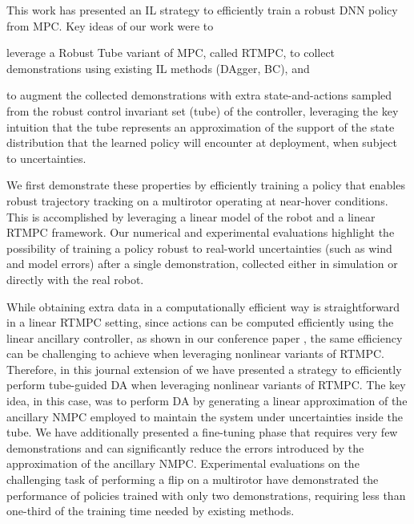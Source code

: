 
This work has presented an \ac{IL} strategy to efficiently train a robust \ac{DNN} policy from \ac{MPC}. Key ideas of our work were to 
\begin{inparaenum}[(a)]
\item leverage a Robust Tube variant of \ac{MPC}, called \ac{RTMPC}, to collect demonstrations using existing \ac{IL} methods (\ac{DAgger}, \ac{BC}), and
\item to augment the collected demonstrations with extra state-and-actions sampled from the robust control invariant set (tube) of the controller, leveraging the key intuition that the tube represents an approximation of the support of the state distribution that the learned policy will encounter at deployment, when subject to uncertainties.
\end{inparaenum}
We first demonstrate these properties by efficiently training a policy that enables robust trajectory tracking on a multirotor operating at near-hover conditions. This is accomplished by leveraging a linear model of the robot and a linear \ac{RTMPC} framework. Our numerical and experimental evaluations  highlight the possibility of training a policy robust to real-world uncertainties (such as wind and model errors) after a single demonstration, collected either in simulation or directly with the real robot.

While obtaining extra data in a computationally efficient way is straightforward in a linear \ac{RTMPC} setting, since actions can be computed efficiently using the linear ancillary controller, as shown in our conference paper \cite{tagliabue2022efficient}, the same efficiency can be challenging to achieve when leveraging nonlinear variants of \ac{RTMPC}. Therefore, in this journal extension of \cite{tagliabue2022efficient} we have presented a strategy to efficiently perform tube-guided \ac{DA} when leveraging nonlinear variants of \ac{RTMPC}. The key idea, in this case, was to perform \ac{DA} by generating a linear approximation of the ancillary \ac{NMPC} employed to maintain the system under uncertainties inside the tube. We have additionally presented a fine-tuning phase that requires very few demonstrations and can significantly reduce the errors introduced by the approximation of the ancillary \ac{NMPC}. Experimental evaluations on the challenging task of performing a flip on a multirotor have demonstrated the performance of policies trained with only two demonstrations, requiring less than one-third of the training time needed by existing methods. 

